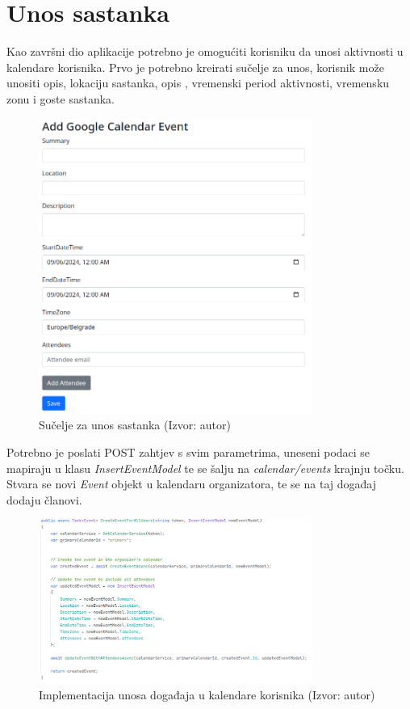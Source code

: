 \documentclass{foi}
\begin{document}
\section{Unos sastanka}
Kao završni dio aplikacije potrebno je omogućiti korisniku da unosi aktivnosti u kalendare korisnika. Prvo je potrebno kreirati sučelje za unos, korisnik može unositi opis, lokaciju sastanka, opis , vremenski period aktivnosti, vremensku zonu i goste sastanka.
\begin{figure}[H]
    \centering
    \includegraphics[width=0.8\textwidth]{slike/insertMeeting.png}
    \caption{Sučelje za unos sastanka (Izvor: autor)}
    \label{fig:InsertMeeting}
\end{figure}
Potrebno je poslati POST zahtjev s svim parametrima, uneseni podaci se mapiraju u klasu \textit{InsertEventModel} te se šalju na \textit{calendar/events} krajnju točku. Stvara se novi \textit{Event} objekt u kalendaru organizatora, te se na taj događaj dodaju članovi.
\begin{figure}[H]
    \centering
    \includegraphics[width=0.8\textwidth]{slike/createEventForAllUsers.png}
    \caption{Implementacija unosa događaja u kalendare korisnika (Izvor: autor)}
    \label{fig:createEventForAllUsers}
\end{figure}
\end{document}
